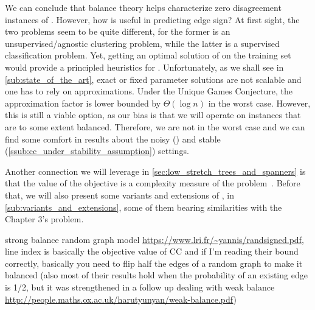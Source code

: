We can conclude that balance theory helps characterize zero disagreement instances of \pcc{}.
However, how is \pcc{} useful in predicting edge sign? At first sight, the two problems seem to be quite
different, for the former is an unsupervised/agnostic clustering problem, while the latter is a
supervised classification problem. Yet, getting an optimal solution of \pcc{} on the training set
would provide a principled heuristics for \esp{}. Unfortunately, as we shall see in
\autoref{sub:state_of_the_art}, exact or fixed parameter solutions are not scalable and one has to
rely on approximations. Under the Unique Games Conjecture, the approximation factor is lower bounded by
$\Theta(\log n)$ in the worst case. However, this is still a viable option, as our bias is that we
will operate on instances that are to some extent balanced. Therefore, we are not in the worst case
and we can find some comfort in results about the noisy () and
stable (\autoref{ssub:cc_under_stability_assumption}) settings.

Another connection we will leverage in \autoref{sec:low_stretch_trees_and_spanners} is that the
value of the \mind{} objective is a complexity measure of the \esp{} problem~\autocite[Section
4.1]{Cesa-Bianchi2012b}. Before that, we will also present some variants and extensions of \pcc{},
in \autoref{sub:variants_and_extensions}, some of them bearing similarities with the Chapter 3's problem.


\iffalse
strong balance random graph model \url{https://www.lri.fr/~yannis/randsigned.pdf}, line index is basically
the objective value of CC and if I'm reading their bound correctly,  basically you need to flip half
the edges of a random graph to make it balanced (also most of their results hold when the
probability of an existing edge is 1/2, but it was strengthened in a follow up dealing with weak
balance \url{http://people.maths.ox.ac.uk/harutyunyan/weak-balance.pdf})

